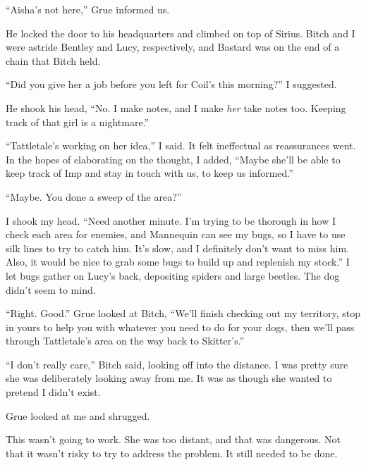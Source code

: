 
``Aisha's not here,'' Grue informed us.



He locked the door to his headquarters and climbed on top of Sirius.  Bitch and I were astride Bentley and Lucy, respectively, and Bastard was on the end of a chain that Bitch held.



``Did you give her a job before you left for Coil's this morning?'' I suggested.



He shook his head, ``No.  I make notes, and I make \emph{her} take notes too.  Keeping track of that girl is a nightmare.''



``Tattletale's working on her idea,'' I said.  It felt ineffectual as reassurances went.  In the hopes of elaborating on the thought, I added, ``Maybe she'll be able to keep track of Imp and stay in touch with us, to keep us informed.''



``Maybe.  You done a sweep of the area?''



I shook my head.  ``Need another minute.  I'm trying to be thorough in how I check each area for enemies, and Mannequin can see my bugs, so I have to use silk lines to try to catch him.  It's slow, and I definitely don't want to miss him.  Also, it would be nice to grab some bugs to build up and replenish my stock.''  I let bugs gather on Lucy's back, depositing spiders and large beetles.  The dog didn't seem to mind.



``Right.  Good.''  Grue looked at Bitch, ``We'll finish checking out my territory, stop in yours to help you with whatever you need to do for your dogs, then we'll pass through Tattletale's area on the way back to Skitter's.''



``I don't really care,'' Bitch said, looking off into the distance.  I was pretty sure she was deliberately looking away from me.  It was as though she wanted to pretend I didn't exist.



Grue looked at me and shrugged.



This wasn't going to work.  She was too distant, and that was dangerous.  Not that it wasn't risky to try to address the problem.  It still needed to be done.



